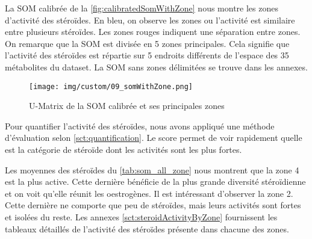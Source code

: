
    La SOM calibrée de la \autoref{fig:calibratedSomWithZone} nous montre les zones d'activité des stéroïdes. En bleu, on observe les zones ou l'activité est similaire entre plusieurs stéroïdes. Les zones rouges indiquent une séparation entre zones. On remarque que la SOM est divisée en 5 zones principales. Cela signifie que l'activité des stéroïdes est répartie sur 5 endroits différents de l'espace des 35 métabolites du dataset. La SOM sans zones délimitées se trouve dans les annexes.

    \begin{figure}[H]
        \centering
        \texttt{[image: img/custom/09\_somWithZone.png]}
        \caption{U-Matrix de la SOM calibrée et ses principales zones}
        \label{fig:calibratedSomWithZone}
    \end{figure}



    Pour quantifier l'activité des stéroïdes, nous avons appliqué une méthode d'évaluation selon \autoref{sct:quantification}. Le score permet de voir rapidement quelle est la catégorie de stéroïde dont les activités sont les plus fortes.

    Les moyennes des stéroïdes du \autoref{tab:som_all_zone} nous montrent que la zone 4 est la plus active. Cette dernière bénéficie de la plus grande diversité stéroïdienne et on voit qu'elle réunit les oestrogènes. Il est intéressant d'observer la zone 2. Cette dernière ne comporte que peu de stéroïdes, mais leurs activités sont fortes et isolées du reste. Les annexes \autoref{sct:steroidActivityByZone} fournissent les tableaux détaillés de l'activité des stéroïdes présente dans chacune des zones.

